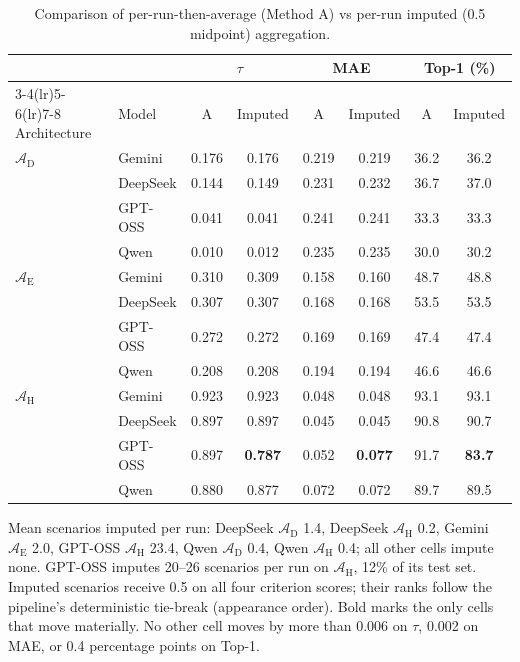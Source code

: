 \documentclass[11pt]{article}
\begin{document}
\begin{table}[htbp]
\centering
\small\centering
\caption{Comparison of per-run-then-average (Method A) vs per-run imputed (0.5 midpoint) aggregation.}
\label{tab:imputed_comparison}
\begin{tabular}{ll cc cc cc}
\toprule
 & & \multicolumn{2}{c}{$\tau$} & \multicolumn{2}{c}{MAE} & \multicolumn{2}{c}{Top-1 (\%)} \\
\cmidrule(lr){3-4}\cmidrule(lr){5-6}\cmidrule(lr){7-8}
Architecture & Model & A & Imputed & A & Imputed & A & Imputed \\
\midrule
$\mathcal{A}_{\text{D}}$ & Gemini   & 0.176 & 0.176 & 0.219 & 0.219 & 36.2 & 36.2 \\
                         & DeepSeek & 0.144 & 0.149 & 0.231 & 0.232 & 36.7 & 37.0 \\
                         & GPT-OSS  & 0.041 & 0.041 & 0.241 & 0.241 & 33.3 & 33.3 \\
                         & Qwen     & 0.010 & 0.012 & 0.235 & 0.235 & 30.0 & 30.2 \\
\addlinespace
$\mathcal{A}_{\text{E}}$ & Gemini   & 0.310 & 0.309 & 0.158 & 0.160 & 48.7 & 48.8 \\
                         & DeepSeek & 0.307 & 0.307 & 0.168 & 0.168 & 53.5 & 53.5 \\
                         & GPT-OSS  & 0.272 & 0.272 & 0.169 & 0.169 & 47.4 & 47.4 \\
                         & Qwen     & 0.208 & 0.208 & 0.194 & 0.194 & 46.6 & 46.6 \\
\addlinespace
$\mathcal{A}_{\text{H}}$ & Gemini   & 0.923 & 0.923 & 0.048 & 0.048 & 93.1 & 93.1 \\
                         & DeepSeek & 0.897 & 0.897 & 0.045 & 0.045 & 90.8 & 90.7 \\
                         & GPT-OSS  & 0.897 & \textbf{0.787} & 0.052 & \textbf{0.077} & 91.7 & \textbf{83.7} \\
                         & Qwen     & 0.880 & 0.877 & 0.072 & 0.072 & 89.7 & 89.5 \\
\bottomrule
\end{tabular}
\renewcommand{\arraystretch}{1.0}
\end{table}

Mean scenarios imputed per run: DeepSeek $\mathcal{A}_{\text{D}}$ 1.4, DeepSeek $\mathcal{A}_{\text{H}}$ 0.2, Gemini $\mathcal{A}_{\text{E}}$ 2.0, GPT-OSS $\mathcal{A}_{\text{H}}$ 23.4, Qwen $\mathcal{A}_{\text{D}}$ 0.4, Qwen $\mathcal{A}_{\text{H}}$ 0.4; all other cells impute none. GPT-OSS imputes 20--26 scenarios per run on $\mathcal{A}_{\text{H}}$, 12\% of its test set. Imputed scenarios receive 0.5 on all four criterion scores; their ranks follow the pipeline's deterministic tie-break (appearance order). Bold marks the only cells that move materially. No other cell moves by more than 0.006 on $\tau$, 0.002 on MAE, or 0.4 percentage points on Top-1.
\end{document}
